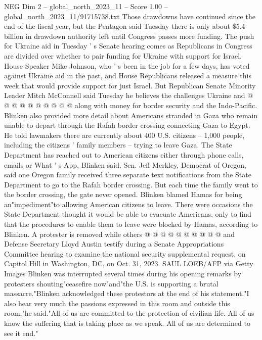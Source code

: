 \begin{textsample}{NEG Dim 2 – global\_north\_2023\_11 – Score 1.00 – global\_north\_2023\_11/91715738.txt}
Those drawdowns have continued since the end of the fiscal year, but the Pentagon said Tuesday there is only about \$5.4 billion in drawdown authority left until Congress passes more funding.
The push for Ukraine aid in Tuesday ' s Senate hearing comes as Republicans in Congress are divided over whether to pair funding for Ukraine with support for Israel.
House Speaker Mike Johnson, who ' s been in the job for a few days, has voted against Ukraine aid in the past, and House Republicans released a measure this week that would provide support for just Israel.
But Republican Senate Minority Leader Mitch McConnell said Tuesday he believes the challenges Ukraine and @ @ @ @ @ @ @ @ @ @ along with money for border security and the Indo-Pacific.
Blinken also provided more detail about Americans stranded in Gaza who remain unable to depart through the Rafah border crossing connecting Gaza to Egypt.
He told lawmakers there are currently about 400 U.S. citizens -- 1,000 people, including the citizens ' family members -- trying to leave Gaza.
The State Department has reached out to American citizens either through phone calls, emails or What ' s App, Blinken said.
Sen.
Jeff Merkley, Democrat of Oregon, said one Oregon family received three separate text notifications from the State Department to go to the Rafah border crossing.
But each time the family went to the border crossing, the gate never opened.
Blinken blamed Hamas for being an"impediment"to allowing American citizens to leave.
There were occasions the State Department thought it would be able to evacuate Americans, only to find that the procedures to enable them to leave were blocked by Hamas, according to Blinken.
A protester is removed while others @ @ @ @ @ @ @ @ @ @ and Defense Secretary Lloyd Austin testify during a Senate Appropriations Committee hearing to examine the national security supplemental request, on Capitol Hill in Washington, DC, on Oct. 31, 2023.
SAUL LOEB/AFP via Getty Images Blinken was interrupted several times during his opening remarks by protesters shouting"ceasefire now"and"the U.S. is supporting a brutal massacre."Blinken acknowledged these protestors at the end of his statement."I also hear very much the passions expressed in this room and outside this room,"he said."All of us are committed to the protection of civilian life.
All of us know the suffering that is taking place as we speak.
All of us are determined to see it end."

\end{textsample}
